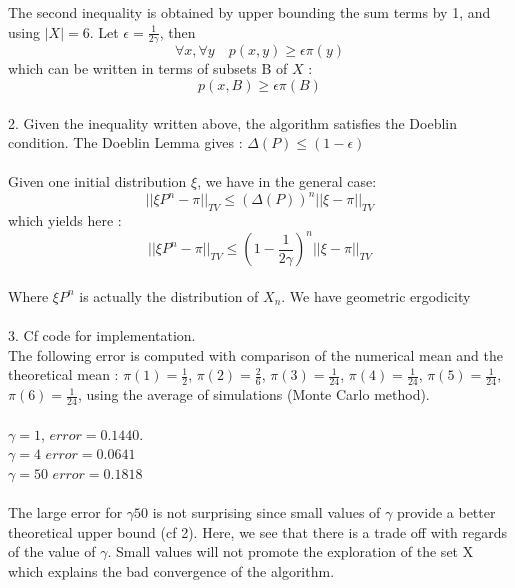 	The second inequality is obtained by upper bounding the sum terms by 1, and using $|X|=6$.
	Let $\boxed{\epsilon=\frac{1}{2\gamma}}$, then
	$$\forall x, \forall y \quad p(x,y) \geq \epsilon  \pi(y)$$
	which can be written in terms of subsets B of $X$ :
	$$\boxed{p(x,B) \geq \epsilon  \pi(B)}$$
	~\\
	2. Given the inequality written above, the algorithm satisfies the Doeblin condition. The Doeblin Lemma gives : $ \boxed{\Delta(P) \leq ( 1 - \epsilon )}$~\\
	~\\
	Given one initial distribution $\xi$, we have in the general case:
	$$||\xi P^n - \pi||_{TV} \leq (\Delta(P))^{ n } ||\xi-\pi||_{TV}$$
	which yields here :
	$$ \boxed{||\xi P^n - \pi||_{TV} \leq (1-\frac{1}{2\gamma})^{ n } ||\xi-\pi||_{TV}}$$~\\
	Where $\xi P^n$ is actually the distribution of $X_n$. We have geometric ergodicity~\\
	~\\
	3. Cf code for implementation.~\\
	The following error is computed with comparison of the numerical mean and the theoretical mean :  $\pi(1)=\frac{1}{2}$, $\pi(2)=\frac{2}{6}$, $\pi(3)=\frac{1}{24}$, $\pi(4)=\frac{1}{24}$, $\pi(5)=\frac{1}{24}$, $\pi(6)=\frac{1}{24}$, using the average of simulations (Monte Carlo method).~\\
	~\\
	$\gamma=1$,  $error=0.1440$.~\\
	$\gamma=4$ $error=0.0641$~\\
	$\gamma=50$ $error=0.1818$~\\
	~\\
	The large error for $\gamma50$ is not surprising since small values of $\gamma$ provide a better theoretical upper bound (cf 2). Here, we see that there is a trade off with regards of the value of $\gamma$. Small values will not promote the exploration of the set X which explains the bad convergence of the algorithm.
